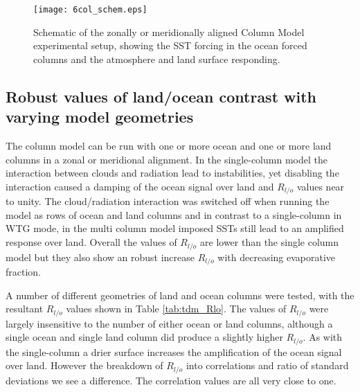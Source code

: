 \begin{figure}[ht]
\texttt{[image: 6col\_schem.eps]}
\caption{Schematic of the zonally or meridionally aligned Column Model 
experimental setup, showing the SST forcing in the ocean forced columns and the 
atmosphere and land surface responding.}
\label{fig:6cmschem}
\end{figure}

\subsection{Robust values of land/ocean contrast with varying model geometries}
\label{sec:robust_rlo}

The column model can be run with one or more ocean and one or more land columns 
in a zonal or meridional alignment. In the single-column model the interaction 
between clouds and radiation lead to instabilities, yet disabling the 
interaction caused a damping of the ocean signal over land and $R_{l/o}$ values 
near to unity. The cloud/radiation interaction was switched off when running the 
model as rows of ocean and land columns and in contrast to a single-column in 
WTG mode, in the multi column model imposed SSTs still lead to an amplified 
response over land. Overall the values of $R_{l/o}$ are lower than the single 
column model but they also show an robust increase $R_{l/o}$ with decreasing 
evaporative fraction.   

A number of different geometries of land and ocean columns were tested, with the 
resultant $R_{l/o}$ values shown in Table \ref{tab:tdm_Rlo}. The values of 
$R_{l/o}$ were largely insensitive to the number of either ocean or land 
columns, although a single ocean and single land column did produce a slightly 
higher $R_{l/o}$. As with the single-column a drier surface increases the 
amplification of the ocean signal over land. However the breakdown of $R_{l/o}$ 
into correlations and ratio of standard deviations we see a difference. The 
correlation values are all very close to one.


